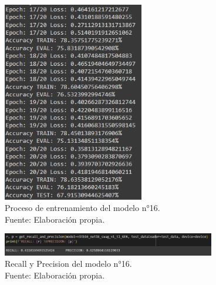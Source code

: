 \begin{figure}[H]
	\begin{center}
		\includegraphics[width=0.55\textwidth]{4/figures/model16_train.PNG}
		\caption[Proceso de entrenamiento del modelo n°16]{Proceso de entrenamiento del modelo n°16. \\
		Fuente: Elaboración propia.}
		\label{4:fig150}
	\end{center}
\end{figure}

\begin{figure}[H]
	\begin{center}
		\includegraphics[width=0.83\textwidth]{4/figures/model16_rp.PNG}
		\caption[Recall y Precision del modelo n°16]{Recall y Precision del modelo n°16. \\
		Fuente: Elaboración propia.}
		\label{4:fig151}
	\end{center}
\end{figure}

